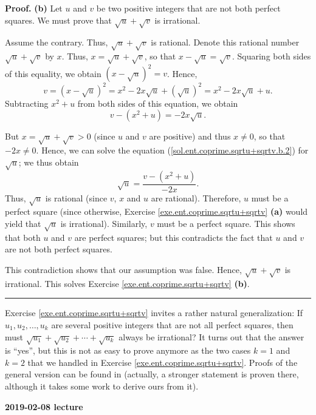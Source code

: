 \documentclass[numbers=enddot,12pt,final,onecolumn,notitlepage]{scrartcl}%
\numberwithin{exer}{subsection}
\theoremstyle{definition}
\newenvironment{fineprint}{\begin{small}}{\end{small}}
\newenvironment{proof}[1][Proof]{\noindent\textbf{#1.} }{\ \rule{0.5em}{0.5em}}
\begin{document}
\begin{fineprint}
\begin{proof}
\textbf{(b)} Let $u$ and $v$ be two positive integers that are not both
perfect squares. We must prove that $\sqrt{u}+\sqrt{v}$ is irrational.

Assume the contrary. Thus, $\sqrt{u}+\sqrt{v}$ is rational. Denote this
rational number $\sqrt{u}+\sqrt{v}$ by $x$. Thus, $x=\sqrt{u}+\sqrt{v}$, so
that $x-\sqrt{u}=\sqrt{v}$. Squaring both sides of this equality, we obtain
$\left(  x-\sqrt{u}\right)  ^{2}=v$. Hence,%
\[
v=\left(  x-\sqrt{u}\right)  ^{2}=x^{2}-2x\sqrt{u}+\left(  \sqrt{u}\right)
^{2}=x^{2}-2x\sqrt{u}+u.
\]
Subtracting $x^{2}+u$ from both sides of this equation, we obtain%
\begin{equation}
v-\left(  x^{2}+u\right)  =-2x\sqrt{u}.
\label{sol.ent.coprime.sqrtu+sqrtv.b.2}%
\end{equation}


But $x=\sqrt{u}+\sqrt{v}>0$ (since $u$ and $v$ are positive) and thus $x\neq
0$, so that $-2x\neq0$. Hence, we can solve the equation
(\ref{sol.ent.coprime.sqrtu+sqrtv.b.2}) for $\sqrt{u}$; we thus obtain%
\[
\sqrt{u}=\dfrac{v-\left(  x^{2}+u\right)  }{-2x}.
\]
Thus, $\sqrt{u}$ is rational (since $v$, $x$ and $u$ are rational). Therefore,
$u$ must be a perfect square (since otherwise, Exercise
\ref{exe.ent.coprime.sqrtu+sqrtv} \textbf{(a)} would yield that $\sqrt{u}$ is
irrational). Similarly, $v$ must be a perfect square. This shows that both $u$
and $v$ are perfect squares; but this contradicts the fact that $u$ and $v$
are not both perfect squares.

This contradiction shows that our assumption was false. Hence, $\sqrt{u}%
+\sqrt{v}$ is irrational. This solves Exercise
\ref{exe.ent.coprime.sqrtu+sqrtv} \textbf{(b)}.
\end{proof}
\end{fineprint}

Exercise \ref{exe.ent.coprime.sqrtu+sqrtv} invites a rather natural
generalization: If $u_{1},u_{2},\ldots,u_{k}$ are several positive integers
that are not all perfect squares, then must $\sqrt{u_{1}}+\sqrt{u_{2}}%
+\cdots+\sqrt{u_{k}}$ always be irrational? It turns out that the answer is
\textquotedblleft yes\textquotedblright, but this is not as easy to prove
anymore as the two cases $k=1$ and $k=2$ that we handled in Exercise
\ref{exe.ent.coprime.sqrtu+sqrtv}. Proofs of the general version can be found
in \cite{Boreic08} (actually, a stronger statement is proven there, although
it takes some work to derive ours from it).

\begin{center}
\textbf{2019-02-08 lecture}
\end{center}
\end{document}
